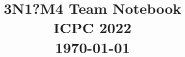 \documentclass[10pt]{article}
\title{\vspace{-4ex}\Large{ \textbf{3N1?M4 Team Notebook} \\ ICPC 2022 \\ \today}}
\author{}
\date{}
\begin{document}
\begin{landscape}
\maketitle
\begin{multicols}{2}

\vspace{-8ex}
\tableofcontents
\newpage
\pagestyle{fancy}



\end{multicols}
\end{landscape}
\end{document}
